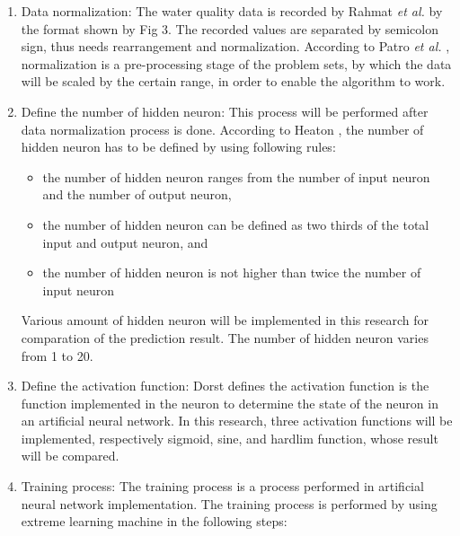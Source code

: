\documentclass{ws-ijait}
\begin{document}
\begin{enumerate}

\item Data normalization: The water quality data is recorded by Rahmat {\it et al.}\cite{16} by the format shown by Fig 3. The recorded values are separated by semicolon sign, thus needs rearrangement and normalization. According to Patro {\it et al.}\cite{22} , normalization is a pre-processing stage of the problem sets, by which the data will be scaled by the certain range, in order to enable the algorithm to work.

\item Define the number of hidden neuron: This process will be performed after data normalization process is done. According to Heaton\cite{23} , the number of hidden neuron has to be defined by using following rules:

\begin{itemize}
\item the number of hidden neuron ranges from the number of input neuron and the number of output neuron,
\item the number of hidden neuron can be defined as two thirds of the total input and output neuron, and
\item the number of hidden neuron is not higher than twice the number of input neuron
\end{itemize}

Various amount of hidden neuron will be implemented in this research for comparation of the prediction result. The number of hidden neuron varies from 1 to 20.

\item Define the activation function: Dorst\cite{24} defines the activation function is the function implemented in the neuron to determine the state of the neuron in an artificial neural network. In this research, three activation functions will be implemented, respectively sigmoid, sine, and hardlim function, whose result will be compared.

\item Training process: The training process is a process performed in artificial neural network implementation. The training process is performed by using extreme learning machine in the following steps:



\end{enumerate}
\end{document}
